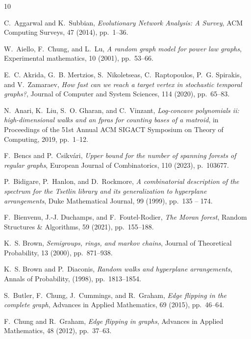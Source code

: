 \documentclass[11pt,a4paper]{article}
\begin{document}
\begin{thebibliography}{10}

{\sc C.~Aggarwal and K.~Subbian}, {\em Evolutionary {{Network Analysis}}: {{A Survey}}}, ACM Computing Surveys, 47 (2014), pp.~1--36.

{\sc W.~Aiello, F.~Chung, and L.~Lu}, {\em A random graph model for power law graphs}, Experimental mathematics, 10 (2001), pp.~53--66.

{\sc E.~C. Akrida, G.~B. Mertzios, S.~Nikoletseas, C.~Raptopoulos, P.~G. Spirakis, and V.~Zamaraev}, {\em How fast can we reach a target vertex in stochastic temporal graphs?}, Journal of Computer and System Sciences, 114 (2020), pp.~65--83.

{\sc N.~Anari, K.~Liu, S.~O. Gharan, and C.~Vinzant}, {\em Log-concave polynomials ii: high-dimensional walks and an fpras for counting bases of a matroid}, in Proceedings of the 51st Annual ACM SIGACT Symposium on Theory of Computing, 2019, pp.~1--12.

{\sc F.~Bencs and P.~Csikv{\'a}ri}, {\em Upper bound for the number of spanning forests of regular graphs}, European Journal of Combinatorics, 110 (2023), p.~103677.

{\sc P.~Bidigare, P.~Hanlon, and D.~Rockmore}, {\em {A combinatorial description of the spectrum for the Tsetlin library and its generalization to hyperplane arrangements}}, Duke Mathematical Journal, 99 (1999), pp.~135 -- 174.

{\sc F.~Bienvenu, J.-J. Duchamps, and F.~{Foutel-Rodier}}, {\em The {{Moran}} forest}, Random Structures \& Algorithms, 59 (2021), pp.~155--188.

{\sc K.~S. Brown}, {\em Semigroups, rings, and markov chains}, Journal of Theoretical Probability, 13 (2000), pp.~871--938.

{\sc K.~S. Brown and P.~Diaconis}, {\em Random walks and hyperplane arrangements}, Annals of Probability,  (1998), pp.~1813--1854.

{\sc S.~Butler, F.~Chung, J.~Cummings, and R.~Graham}, {\em Edge flipping in the complete graph}, Advances in Applied Mathematics, 69 (2015), pp.~46--64.

{\sc F.~Chung and R.~Graham}, {\em Edge flipping in graphs}, Advances in Applied Mathematics, 48 (2012), pp.~37--63.


\end{thebibliography}
\end{document}

